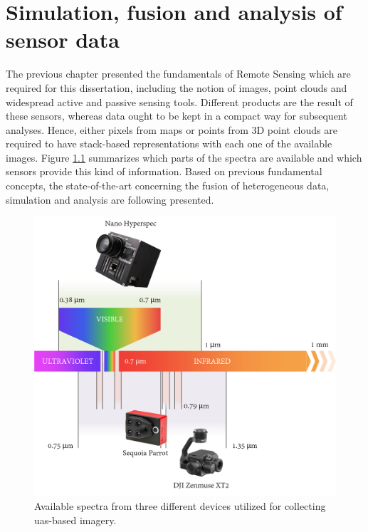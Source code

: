 \chapter{Simulation, fusion and analysis of sensor data}
\label{sec:context_rs}

The previous chapter presented the fundamentals of Remote Sensing which are required for this dissertation, including the notion of images, point clouds and widespread active and passive sensing tools. Different products are the result of these sensors, whereas data ought to be kept in a compact way for subsequent analyses. Hence, either pixels from maps or points from 3D point clouds are required to have stack-based representations with each one of the available images. Figure \ref{fig:available_spectra} summarizes which parts of the spectra are available and which sensors provide this kind of information. Based on previous fundamental concepts, the state-of-the-art concerning the fusion of heterogeneous data, simulation and analysis are following presented.

\begin{figure}[ht]
	\includegraphics[width=\linewidth]{figs/context/spectra_devices.png}
	\caption{Available spectra from three different devices utilized for collecting \acrshort{uas}-based imagery. }
    \label{fig:available_spectra}
\end{figure}

